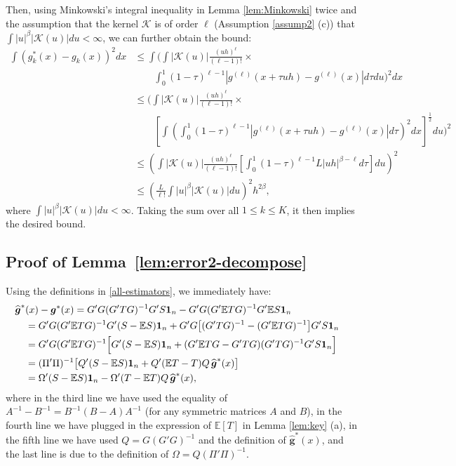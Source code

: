 \documentclass[preprint,11pt]{article}
\newcommand{\mbb}{\mathbb}
\newcommand{\mcal}{\mathcal}
\newcommand{\bg}{{\boldsymbol g}}
\numberwithin{equation}{section}
\begin{document}
Then, using Minkowski's integral inequality in Lemma \ref{lem:Minkowski} twice and the assumption that the kernel $\mcal{K}$ is of order $\ell$ (Assumption \ref{assump2} (c)) that $\int |u|^\beta|\mcal{K}(u)|du<\infty$, we can further obtain the bound:
\begin{align*}
    \int (g_k^*(x)-g_k(x))^2dx&\le \int \Bigg(\int |\mcal{K}(u)|\frac{(uh)^{\ell}}{(\ell-1)!}\times\\
    &\qquad\int_{0}^{1}(1-\tau)^{\ell-1}|g^{(\ell)}(x+\tau uh)-g^{(\ell)}(x)|d\tau du\Bigg)^2 dx\\
    &\le \Bigg(\int |\mcal{K}(u)|\frac{(uh)^{\ell}}{(\ell-1)!}\times\\
    &\qquad\left[\int \left(\int_{0}^{1}(1-\tau)^{\ell-1}|g^{(\ell)}(x+\tau uh)-g^{(\ell)}(x)|d\tau\right)^2dx\right]^{\frac{1}{2}}du\Bigg)^2\\
    &\le \left(\int |\mcal{K}(u)| \frac{(uh)^{\ell}}{(\ell-1)!}\left[\int_{0}^{1}(1-\tau)^{\ell-1}L|uh|^{\beta-\ell}d\tau\right]du\right)^2\\
    &\le \left(\frac{L}{\ell!}\int |u|^\beta|\mcal{K}(u)|du\right)^2h^{2\beta},
\end{align*}
where $\int |u|^\beta|\mcal{K}(u)|du<\infty$. Taking the sum over all $1\le k\le K$, it then implies the desired bound.

\subsection{Proof of Lemma~\ref{lem:error2-decompose}}
Using the definitions in \eqref{all-estimators}, we immediately have:
\begin{align} \label{proof-erro2decomp}
\widehat{\boldsymbol g}^*&(x)-{\boldsymbol g}^*(x) 
= G'G(G'TG)^{-1}G'S{\bf 1}_n - G'G(G'\mathbb{E}TG)^{-1}G'\mathbb{E}S{\bf 1}_n \cr
&= G'G(G'\mbb{E}TG)^{-1}G'(S-\mathbb{E}S){\bf 1}_n + G'G\bigl[(G'TG)^{-1}-(G'\mathbb{E}T G)^{-1}\bigr]G'S{\bf 1}_n\cr
&= G'G(G'\mbb{E}TG)^{-1}\Bigl[ G'(S-\mathbb{E}S){\bf 1}_n + (G'\mathbb{E}T G -G'TG)(G'TG)^{-1}G'S{\bf 1}_n\Bigr]\cr
&= (\Pi'\Pi)^{-1}\bigl[ Q'(S-\mathbb{E}S){\bf 1}_n + Q'(\mathbb{E}T-T)Q \, \widehat{\boldsymbol g}^*(x)\bigr]\cr
&= \Omega'(S-\mathbb{E}S){\bf 1}_n - \Omega'(T-\mathbb{E}T)Q\,\widehat{\bg}^*(x), 
\end{align}
where in the third line we have used the equality of $A^{-1}-B^{-1}=B^{-1}(B-A)A^{-1}$ (for any symmetric matrices $A$ and $B$), in the fourth line we have plugged in the expression of $\mathbb{E}[T]$ in Lemma \ref{lem:key} (a), in the fifth line we have used  $Q=G(G'G)^{-1}$ and the definition of $\widehat{\boldsymbol g}^*(x)$, and the last line is due to the definition of $\Omega=Q(\Pi'\Pi)^{-1}$. 
\end{document}
